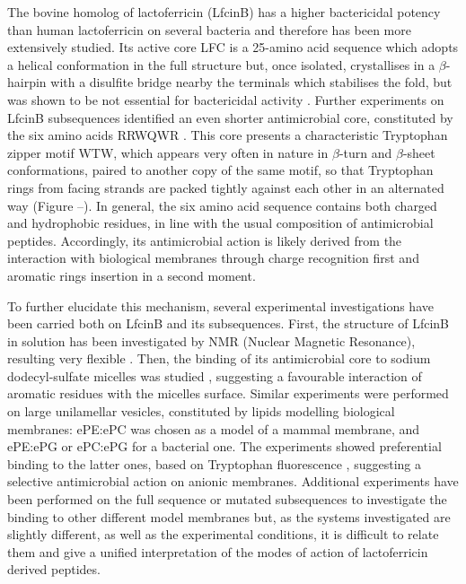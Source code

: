 The bovine homolog of lactoferricin (LfcinB) has a higher bactericidal potency than human lactoferricin on several bacteria \cite{Cochran2001} and therefore has been more extensively studied. Its active core LFC is a 25-amino acid sequence which adopts a helical conformation in the full structure but, once isolated, crystallises in a $\beta$-hairpin with a disulfite bridge nearby the terminals which stabilises the fold, but was shown to be not essential for bactericidal activity \cite{Cochran2001}.
%
Further experiments on LfcinB subsequences identified an even shorter antimicrobial core, constituted by the six amino acids RRWQWR \cite{Schibli1999}. This core presents a characteristic Tryptophan zipper motif WTW, which appears very often in nature in $\beta$-turn and $\beta$-sheet conformations, paired to another copy of the same motif, so that Tryptophan rings from facing strands are packed tightly against each other in an alternated way \cite{Cochran2001} (Figure --).
In general, the six amino acid sequence contains both charged and hydrophobic residues, in line with the usual composition of antimicrobial peptides. Accordingly, its antimicrobial action is likely derived from the interaction with biological membranes through charge recognition first and aromatic rings insertion in a second moment.

To further elucidate this mechanism, several experimental investigations have been carried both on LfcinB and its subsequences. First, the structure of LfcinB in solution has been investigated by NMR (Nuclear Magnetic Resonance), resulting very flexible \cite{Hwang1998}. Then, the binding of its antimicrobial core to sodium dodecyl-sulfate micelles was studied \cite{Schibli1999}, suggesting a favourable interaction of aromatic residues with the micelles surface.
%
Similar experiments were performed on large unilamellar vesicles, constituted by lipids modelling biological membranes: ePE:ePC was chosen as a model of a mammal membrane, and ePE:ePG or ePC:ePG for a bacterial one. The experiments showed preferential binding to the latter ones, based on Tryptophan fluorescence \cite{Nguyen2005}, suggesting a selective antimicrobial action on anionic membranes.
%
Additional experiments have been performed on the full sequence or mutated subsequences \cite{Tsutsumi2012,Arseneault2010} to investigate the binding to other different model membranes but, as the systems investigated are slightly different, as well as the experimental conditions, it is difficult to relate them and give a unified interpretation of the modes of action of lactoferricin derived peptides.

